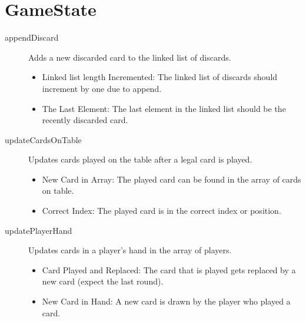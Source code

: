 \section{GameState}
\begin{description}
	\item[appendDiscard] Adds a new discarded card to the linked list of discards.
	\begin{itemize}
		\item Linked list length Incremented: The linked list of discards should increment by one due to append.
		\item The Last Element: The last element in the linked list should be the recently discarded card.
	\end{itemize}
	\item[updateCardsOnTable] Updates cards played on the table after a legal card is played.
	\begin{itemize}
		\item New Card in Array: The played card can be found in the array of cards on table.
		\item Correct Index: The played card is in the correct index or position.
    \end{itemize}
    \item[updatePlayerHand] Updates cards in a player's hand in the array of players.
	\begin{itemize}
		\item Card Played and Replaced: The card that is played gets replaced by a new card (expect the last round).
		\item New Card in Hand: A new card is drawn by the player who played a card.
	\end{itemize}
\end{description}